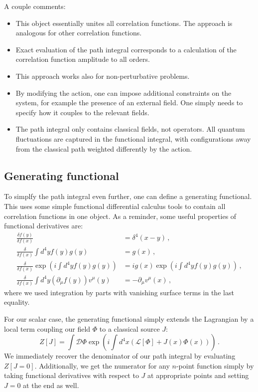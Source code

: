 \documentclass[12pt]{memoir}
\begin{document}
A couple comments:
\begin{itemize}
  \item This object essentially unites all correlation functions.
    The approach is analogous for other correlation functions.
  \item Exact evaluation of the path integral corresponds to a calculation of the correlation function
    amplitude to all orders.
  \item This approach works also for non-perturbative problems.
  \item By modifying the action, one can impose additional constraints on the system,
    for example the presence of an external field.
    One simply needs to specify how it couples to the relevant fields.
  \item The path integral only contains classical fields, not operators.
    All quantum fluctuations are captured in the functional integral,
    with configurations away from the classical path weighted differently by the action.
\end{itemize}

\subsection{Generating functional}

To simplfy the path integral even further, one can define a generating functional.
This uses some simple functional differential calculus tools to contain all correlation functions in one object.
As a reminder, some useful properties of functional derivatives are:
\begin{align}
  \frac{\delta f(y)}{\delta f(x)} & = \delta^4(x - y)\,, \\
  \frac{\delta}{\delta f(x)} \int d^4y f(y) g(y) &= g(x)\,, \\
  \frac{\delta}{\delta f(x)} \exp(i \int d^4y f(y) g(y)) &= i g(x) \exp(i \int d^4y f(y) g(y))\,, \\
  \frac{\delta}{\delta f(x)} \int d^4y (\partial_{\mu} f(y)) v^{\mu}(y) & = - \partial_{\mu} v^{\mu}(x)\,,
\end{align}
where we used integration by parts with vanishing surface terms in the last equality.

For our scalar case, the generating functional simply extends the Lagrangian
by a local term coupling our field $\Phi$ to a classical source $J$:
\begin{equation}
  Z[J] = \int \mathcal{D}\Phi \exp(i \int d^4x (\mathcal{L}[\Phi] + J(x) \Phi(x)))\,.
\end{equation}
We immediately recover the denominator of our path integral by evaluating $Z[J=0]$.
Additionally, we get the numerator for any $n$-point function
simply by taking functional derivatives with respect to $J$ at appropriate points
and setting $J=0$ at the end as well.
\end{document}
